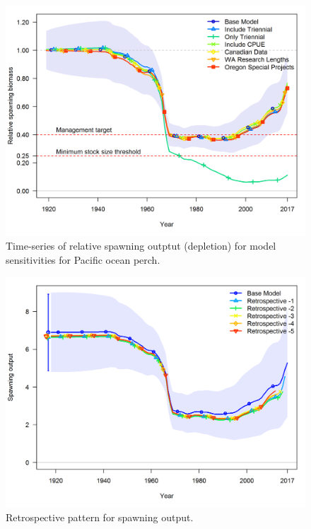 \documentclass[12pt,]{article}
\begin{document}
\FloatBarrier

\begin{figure}
\centering
\includegraphics{Figures/depl_sens2.png}
\caption{Time-series of relative spawning outptut (depletion) for model
sensitivities for Pacific ocean perch. \label{fig:sens2_depl}}
\end{figure}

\FloatBarrier

\begin{figure}
\centering
\includegraphics{Figures/compare2_spawnbio_uncertainty.png}
\caption{Retrospective pattern for spawning output.
\label{fig:retro_sb}}
\end{figure}
\end{document}
